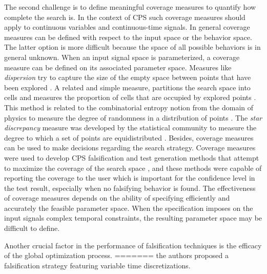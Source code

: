 The second challenge is to define meaningful coverage measures to quantify how complete the search is. In the context of CPS such coverage measures should apply to continuous
variables and continuous-time signals. In general coverage measures can be defined with respect to the input space or the behavior space. The latter option is more difficult because the space of all possible behaviors is in general unknown. When an input signal space is parameterized, a coverage measure can be defined on its associated parameter space. Measures like \emph{dispersion} try to capture the size of the empty space between points that have been explored \cite{Esposito04}.
A related and simple measure, partitions the search space into cells and measures the proportion of cells that are occupied by explored points \cite{Skruch2011}. This method is related to the combinatorial entropy notion from the domain of physics to measure the degree of randomness in a distribution of points \cite{Gabbay06}. The \emph{star discrepancy} measure was developed by the statistical community 
to measure the degree to which a set of points are equidistributed \cite{Heinrich03}. Besides, coverage measures can be used to make decisions regarding the search strategy. Coverage measures were used to develop CPS falsification and test generation methods that attempt to maximize the coverage of the search space \cite{DangN09,Dreossi2015,CAV2017}, and these methods were capable of reporting the coverage to the user which is important for the confidence level in the test result, especially when no falsifying behavior is found. The effectiveness of coverage measures depends on the ability of specifying efficiently and accurately the feasible parameter space. When the specification imposes on the input signals complex temporal constraints, the resulting parameter space may be difficult to define. 




Another crucial factor in the performance of falsification techniques is the efficacy of the global optimization process.
=======
\cite{DBLP:conf/atva/DeshmukhJKM15} the authors proposed a
falsification strategy featuring variable time discretizations.

